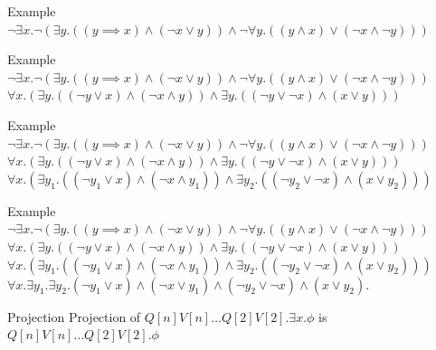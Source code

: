 \documentclass{beamer}
\begin{document}
\begin{frame}{Example}
$\lnot\exists x.\lnot(\exists y.((y\implies x)\wedge(\lnot x\vee y))\wedge\lnot\forall y.((y\wedge x)\vee(\lnot x\wedge\lnot y)))$\newline
\end{frame}

\begin{frame}{Example}
$\lnot\exists x.\lnot(\exists y.((y\implies x)\wedge(\lnot x\vee y))\wedge\lnot\forall y.((y\wedge x)\vee(\lnot x\wedge\lnot y)))$\newline
$\forall x.(\exists y.((\lnot y\vee x)\wedge(\lnot x\wedge y)) \wedge\exists y.((\lnot y \vee\lnot x)\wedge(x\vee y)))$\newline
\end{frame}

\begin{frame}{Example}
$\lnot\exists x.\lnot(\exists y.((y\implies x)\wedge(\lnot x\vee y))\wedge\lnot\forall y.((y\wedge x)\vee(\lnot x\wedge\lnot y)))$\newline
$\forall x.(\exists y.((\lnot y\vee x)\wedge(\lnot x\wedge y))\wedge\exists y.((\lnot y \vee\lnot x)\wedge(x\vee y)))$\newline
$\forall x.(\exists y_1.((\lnot y_1\vee x)\wedge(\lnot x\wedge y_1))\wedge\exists y_2.((\lnot y_2 \vee\lnot x)\wedge(x\vee y_2)))$\newline
\end{frame}

\begin{frame}{Example}
$\lnot\exists x.\lnot(\exists y.((y\implies x)\wedge(\lnot x\vee y))\wedge\lnot\forall y.((y\wedge x)\vee(\lnot x\wedge\lnot y)))$\newline
$\forall x.(\exists y.((\lnot y\vee x)\wedge(\lnot x\wedge y))\wedge\exists y.((\lnot y \vee\lnot x)\wedge(x\vee y)))$\newline
$\forall x.(\exists y_1.((\lnot y_1\vee x)\wedge(\lnot x\wedge y_1))\wedge\exists y_2.((\lnot y_2\vee\lnot x)\wedge(x\vee y_2)))$\newline
$\forall x.\exists y_1 .\exists y_2 .(\lnot y_1 \vee x)\wedge(\lnot x \vee y_1) \wedge (\lnot y_2\vee\lnot x) \wedge(x\vee y_2).$\newline
\end{frame}

\begin{frame}{Projection}
Projection of $Q[n]V[n]\dots Q[2]V[2].\exists x.\phi$\newline
is $Q[n]V[n]\dots Q[2]V[2].\phi$\newline
\end{frame}
\end{document}
